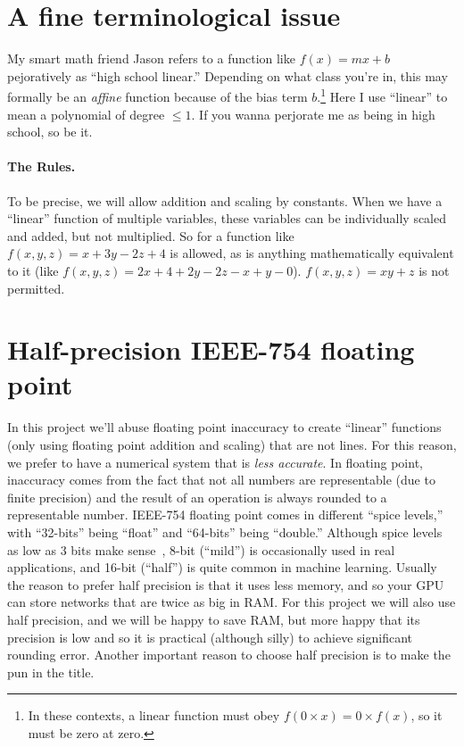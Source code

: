 \documentclass[twocolumn]{article}
\begin{document}
\section{A fine terminological issue}
My smart math friend Jason refers to a function like $f(x) = mx + b$
pejoratively as ``high school linear.'' Depending on what class you're
in, this may formally be an {\it affine} function because of the bias
term $b$.\footnote{In these contexts, a linear function must obey $f(0 \times x) = 0 \times f(x)$,
so it must be zero at zero.} Here I use ``linear'' to mean a polynomial
of degree $\leq 1$. If you wanna perjorate me as being in high school,
so be it.

\paragraph{The Rules.}
To be precise, we will allow addition and scaling by constants. When
we have a ``linear'' function of multiple variables, these variables
can be individually scaled and added, but not multiplied. So for
a function like $f(x, y, z) = x + 3y - 2z + 4$ is allowed, as is
anything mathematically equivalent to it (like $f(x, y, z) = 2x + 4 + 2y - 2z - x + y - 0$).
$f(x, y, z) = xy + z$ is not permitted.

\section{Half-precision IEEE-754 floating point}
In this project we'll abuse floating point inaccuracy to create
``linear'' functions (only using floating point addition and scaling)
that are not lines. For this reason, we prefer to have a numerical
system that is {\em less accurate}. In floating point, inaccuracy comes
from the fact that not all numbers are representable (due to finite
precision) and the result of an operation is always rounded to a
representable number. IEEE-754 floating point comes in different
``spice levels,'' with ``32-bits'' being ``float'' and ``64-bits''
being ``double.'' Although spice levels as low as 3 bits make
sense~\cite{murphy2019nan}, 8-bit (``mild'') is occasionally used in
real applications, and 16-bit (``half'') is quite common in machine
learning. Usually the reason to prefer half precision is that it uses
less memory, and so your GPU can store networks that are twice as big
in RAM. For this project we will also use half precision, and we will
be happy to save RAM, but more happy that its precision is low and so
it is practical (although silly) to achieve significant rounding
error. Another important reason to choose half precision is to make
the pun in the title.
\end{document}
